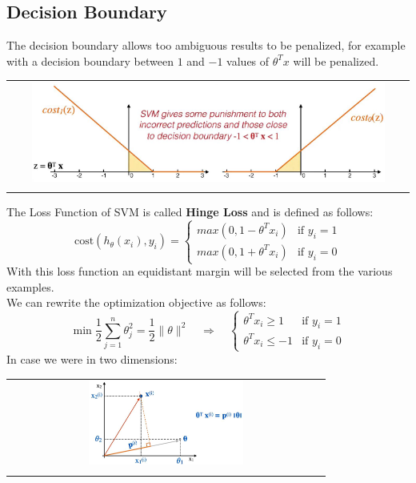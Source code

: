 \subsection{Decision Boundary}
The decision boundary allows too ambiguous results to be penalized, for example with a decision boundary between $1$ and $-1$ values of $\theta^Tx$ will be penalized.
\begin{center}
    \begin{tabular}{c}
        \\ \includegraphics[width=0.9\textwidth]{images/SVM2.png} \\ \\
    \end{tabular}
\end{center}
The Loss Function of SVM is called \textbf{Hinge Loss} and is defined as follows:
\begin{equation} \tag{Hinge Loss}
    \text{cost}(h_{\theta}(x_i),y_i) =
    \begin{cases}
        max(0, 1 - \theta^Tx_i) & \text{if } y_i = 1 \\
        max(0, 1 + \theta^Tx_i) & \text{if } y_i = 0
    \end{cases}
\end{equation}
With this loss function an equidistant margin will be selected from the various examples. \\
We can rewrite the optimization objective as follows:
\begin{equation} \tag*{}
    \min \frac{1}{2} \sum^n_{j=1} \theta^2_j = \frac{1}{2} \|\theta\|^2
    \quad\Rightarrow\quad
    \begin{cases}
        \theta^Tx_i \geq 1 & \text{if } y_i = 1 \\
        \theta^Tx_i \leq -1 & \text{if } y_i = 0
    \end{cases}
\end{equation}
In case we were in two dimensions:
\begin{center}
    \begin{tabular}{c}
        \\ \includegraphics[width=0.5\textwidth]{images/SVM3.png} \\ \\
    \end{tabular}
\end{center}

